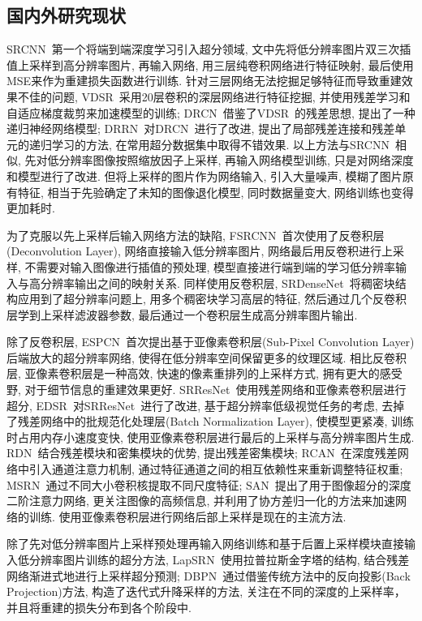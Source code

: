 \subsection{国内外研究现状}
SRCNN~\cite{SRCNN2014}第一个将端到端深度学习引入超分领域, 文中先将低分辨率图片双三次插值上采样到高分辨率图片, 再输入网络, 用三层纯卷积网络进行特征映射, 最后使用MSE来作为重建损失函数进行训练. 针对三层网络无法挖掘足够特征而导致重建效果不佳的问题, VDSR~\cite{VDSR2016}采用20层卷积的深层网络进行特征挖掘, 并使用残差学习和自适应梯度裁剪来加速模型的训练; DRCN~\cite{DRCN2016}借鉴了VDSR~\cite{VDSR2016}的残差思想, 提出了一种递归神经网络模型; DRRN~\cite{DRRN2017}对DRCN~\cite{DRCN2016}进行了改进, 提出了局部残差连接和残差单元的递归学习的方法, 在常用超分数据集中取得不错效果. 以上方法与SRCNN~\cite{SRCNN2014}相似, 先对低分辨率图像按照缩放因子上采样, 再输入网络模型训练, 只是对网络深度和模型进行了改进. 但将上采样的图片作为网络输入, 引入大量噪声, 模糊了图片原有特征, 相当于先验确定了未知的图像退化模型, 同时数据量变大, 网络训练也变得更加耗时. 

为了克服以先上采样后输入网络方法的缺陷, FSRCNN~\cite{FSRCNN2016}首次使用了反卷积层(Deconvolution Layer), 网络直接输入低分辨率图片, 网络最后用反卷积进行上采样, 不需要对输入图像进行插值的预处理, 模型直接进行端到端的学习低分辨率输入与高分辨率输出之间的映射关系. 同样使用反卷积层, SRDenseNet~\cite{SRDenseNet2017}将稠密块结构应用到了超分辨率问题上, 用多个稠密块学习高层的特征, 然后通过几个反卷积层学到上采样滤波器参数, 最后通过一个卷积层生成高分辨率图片输出. 

除了反卷积层, ESPCN~\cite{ESPCN2016}首次提出基于亚像素卷积层(Sub-Pixel Convolution Layer)后端放大的超分辨率网络, 使得在低分辨率空间保留更多的纹理区域. 相比反卷积层, 亚像素卷积层是一种高效, 快速的像素重排列的上采样方式, 拥有更大的感受野, 对于细节信息的重建效果更好. SRResNet~\cite{SRGAN2017}使用残差网络和亚像素卷积层进行超分, EDSR~\cite{EDSR2017}对SRResNet~\cite{SRGAN2017}进行了改进, 基于超分辨率低级视觉任务的考虑, 去掉了残差网络中的批规范化处理层(Batch Normalization Layer), 使模型更紧凑, 训练时占用内存小速度变快, 使用亚像素卷积层进行最后的上采样与高分辨率图片生成. RDN~\cite{RDN2018}结合残差模块和密集模块的优势, 提出残差密集模块; RCAN~\cite{RCAN2018}在深度残差网络中引入通道注意力机制, 通过特征通道之间的相互依赖性来重新调整特征权重; MSRN~\cite{MSRN2018}通过不同大小卷积核提取不同尺度特征; SAN~\cite{SAN2019}提出了用于图像超分的深度二阶注意力网络, 更关注图像的高频信息, 并利用了协方差归一化的方法来加速网络的训练. 使用亚像素卷积层进行网络后部上采样是现在的主流方法. 

除了先对低分辨率图片上采样预处理再输入网络训练和基于后置上采样模块直接输入低分辨率图片训练的超分方法, LapSRN~\cite{LapSRN2017}使用拉普拉斯金字塔的结构, 结合残差网络渐进式地进行上采样超分预测; DBPN~\cite{DBPN2018}通过借鉴传统方法中的反向投影(Back Projection)方法, 构造了迭代式升降采样的方法, 关注在不同的深度的上采样率，并且将重建的损失分布到各个阶段中. 


